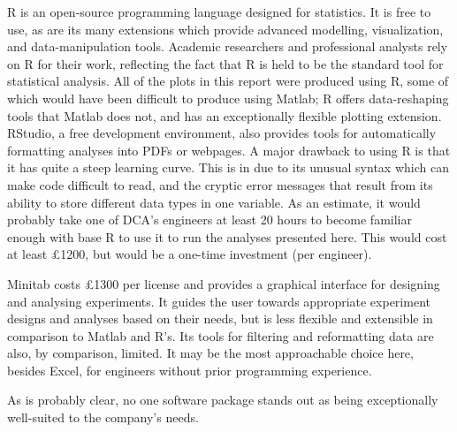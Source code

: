 \documentclass[11pt,a4paper,article]{memoir} %
\begin{document}
R is an open-source programming language designed for statistics. It is free to use, as are its many extensions which provide advanced modelling, visualization, and data-manipulation tools. Academic researchers and professional analysts rely on R for their work, reflecting the fact that R is held to be the standard tool for statistical analysis. All of the plots in this report were produced using R, some of which would have been difficult to produce using Matlab; R offers data-reshaping tools that Matlab does not, and has an exceptionally flexible plotting extension. RStudio, a free development environment, also provides tools for automatically formatting analyses into PDFs or webpages. A major drawback to using R is that it has quite a steep learning curve. This is in due to its unusual syntax which can make code difficult to read, and the cryptic error messages that result from its ability to store different data types in one variable. As an estimate, it would probably take one of DCA's engineers at least 20 hours to become familiar enough with base R to use it to run the analyses presented here. This would cost at least £1200, but would be a one-time investment (per engineer). 
\par
Minitab costs £1300 per license and provides a graphical interface for designing and analysing experiments. It guides the user towards appropriate experiment designs and analyses based on their needs, but is less flexible and extensible in comparison to Matlab and R's. Its tools for filtering and reformatting data are also, by comparison, limited. It may be the most approachable choice here, besides Excel, for engineers without prior programming experience.
\par
As is probably clear, no one software package stands out as being exceptionally well-suited to the company's needs.

\end{document}
